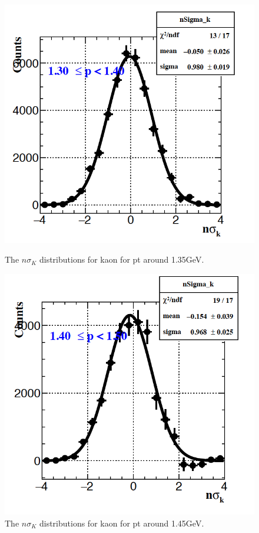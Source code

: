 \begin{figure}[htbp]
\begin{minipage}[htbp]{0.5\linewidth}
\centering
\includegraphics[width=1.0\textwidth]{figure/Run14_D0HFT/nsigmaK_14_1.png}
\caption{The $n\sigma_{K}$ distributions for kaon for pt around 1.35GeV. \label{fig:kaon_1dedx1_2}}
\end{minipage}
\hfill
\begin{minipage}[htbp]{0.5\linewidth}
\centering
\includegraphics[width=1.0\textwidth]{figure/Run14_D0HFT/nsigmaK_14_2.png}
\caption{The  $n\sigma_{K}$ distributions for kaon for pt around 1.45GeV. \label{fig:kaon_1dedx2_2}}
\end{minipage}
\end{figure}

